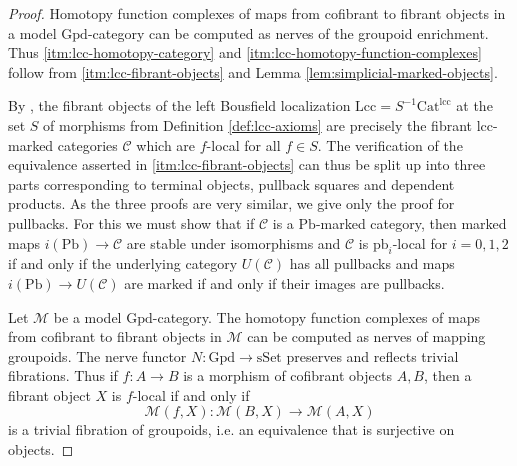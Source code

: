 \documentclass[a4paper]{article}
\theoremstyle{remark}
\theoremstyle{definition}
\begin{document}
\begin{proof}
  Homotopy function complexes of maps from cofibrant to fibrant objects in a model $\mathrm{Gpd}$-category can be computed as nerves of the groupoid enrichment.
  Thus \ref{itm:lcc-homotopy-category} and \ref{itm:lcc-homotopy-function-complexes} follow from \ref{itm:lcc-fibrant-objects} and Lemma \ref{lem:simplicial-marked-objects}.

  By \citet[Theorem 4.1.1]{hirschhorn}, the fibrant objects of the left Bousfield localization $\mathrm{Lcc} = S^{-1} \mathrm{Cat}^{\mathrm{lcc}}$ at the set $S$ of morphisms from Definition \ref{def:lcc-axioms} are precisely the fibrant lcc-marked categories $\mathcal{C}$ which are $f$-local for all $f \in S$.
  The verification of the equivalence asserted in \ref{itm:lcc-fibrant-objects} can thus be split up into three parts corresponding to terminal objects, pullback squares and dependent products.
  As the three proofs are very similar, we give only the proof for pullbacks.
  For this we must show that if $\mathcal{C}$ is a $\mathrm{Pb}$-marked category, then marked maps $i(\mathrm{Pb}) \rightarrow \mathcal{C}$ are stable under isomorphisms and $\mathcal{C}$ is $\mathrm{pb}_i$-local for $i = 0, 1, 2$ if and only if the underlying category $U(\mathcal{C})$ has all pullbacks and maps $i(\mathrm{Pb}) \rightarrow U(\mathcal{C})$ are marked if and only if their images are pullbacks.

  Let $\mathcal{M}$ be a model $\mathrm{Gpd}$-category.
  The homotopy function complexes of maps from cofibrant to fibrant objects in $\mathcal{M}$ can be computed as nerves of mapping groupoids.
  The nerve functor $N : \mathrm{Gpd} \rightarrow \mathrm{sSet}$ preserves and reflects trivial fibrations.
  Thus if $f : A \rightarrow B$ is a morphism of cofibrant objects $A, B$, then a fibrant object $X$ is $f$-local if and only if
  \begin{equation}
    \label{eq:locality}
    \mathcal{M}(f, X) : \mathcal{M}(B, X) \rightarrow \mathcal{M}(A, X)
  \end{equation}
  is a trivial fibration of groupoids, i.e. an equivalence that is surjective on objects.
  

\end{proof}
\end{document}
